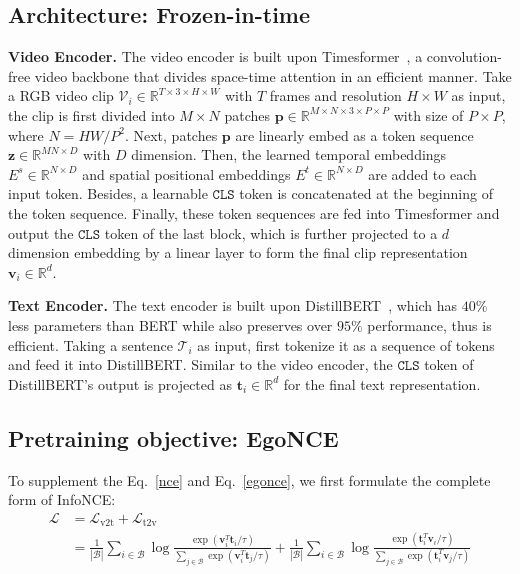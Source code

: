\documentclass{article}
\newcommand{\model}{EgoNCE\xspace}
\begin{document}
\subsection{Architecture: Frozen-in-time~\cite{bain2021frozen}}
\textbf{Video Encoder.}
The video encoder is built upon Timesformer~\cite{timesformer}, a convolution-free video backbone that divides space-time attention in an efficient manner.
Take a RGB video clip $\mathcal{V}_i \in \mathbb{R}^{T\times3 \times H\times W}$ with $T$ frames and resolution $H\times W$ as input, the clip is first divided into $M\times N$ patches $\mathbf{p}\in \mathbb{R}^{M\times N\times 3\times P\times P}$ with size of $P\times P$, where $N=HW/P^2$. 
Next, patches $\mathbf{p}$ are linearly embed as a token sequence $\mathbf{z}\in \mathbb{R}^{MN\times D}$ with $D$ dimension. 
Then, the learned temporal embeddings $E^s\in \mathbb{R}^{N\times D}$ and spatial positional embeddings  $E^t\in \mathbb{R}^{N\times D}$ are added to each input token. Besides, a learnable $\texttt{CLS}$ token is concatenated at the beginning of the token sequence. 
Finally, these token sequences are fed into Timesformer and output the $\texttt{CLS}$ token of the last block, which is further projected to a $d$ dimension embedding by a linear layer to form the final clip representation $\mathbf{v}_i\in \mathbb{R}^{d}$.

\textbf{Text Encoder.}
The text encoder is built upon DistillBERT~\cite{distilbert}, which has $40\%$ less parameters than BERT while also preserves over $95\%$ performance, thus is efficient.
Taking a sentence $\mathcal{T}_i$ as input, first tokenize it as a sequence of tokens and feed it into DistillBERT. 
Similar to the video encoder, the $\texttt{CLS}$ token of DistillBERT's output is projected as $\mathbf{t}_i\in \mathbb{R}^d$ for the final text representation.

\subsection{Pretraining objective: \model}
To supplement the Eq.~\ref{nce} and Eq.~\ref{egonce}, we first formulate the complete form of InfoNCE:
\begin{equation}
\begin{aligned}
\mathcal{L}&=\mathcal{L}_{\text{v2t}}+\mathcal{L}_{\text{t2v}} \\
&=\frac{1}{|\mathcal{B}|}\sum_{i\in \mathcal{B}} \log \frac{\exp(\mathbf{v}_i^T\mathbf{t}_i /\tau)}{\sum_{j\in \mathcal{B}} \exp( \mathbf{v}_i^T\mathbf{t}_j /\tau)}+
\frac{1}{|\mathcal{B}|}\sum_{i\in \mathcal{B}} \log \frac{\exp(\mathbf{t}_i^T\mathbf{v}_i /\tau)}{\sum_{j\in \mathcal{B}} \exp( \mathbf{t}_i^T\mathbf{v}_j /\tau)}
\label{nce_dual}
\end{aligned}
\end{equation}
\end{document}

